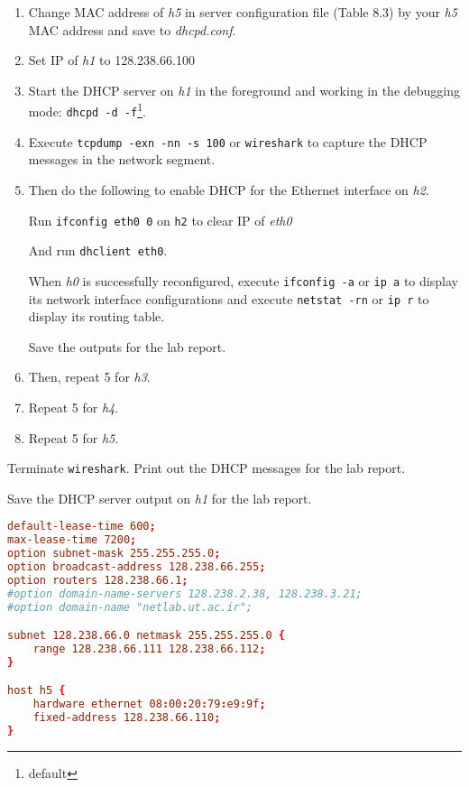 \documentclass{../UTNetLab}
\begin{document}
    \begin{enumerate}
        \item Change MAC address of \textit{h5} in server configuration file (Table 8.3) by your \textit{h5} MAC address and save to \textit{dhcpd.conf}.
        
        \item Set IP of \textit{h1} to {128.238.66.100}
        
        \item Start the DHCP server on \textit{h1} in the foreground and working in the debugging mode: \lstinline{dhcpd -d -f}\footnote{default }.
        
        \item Execute \lstinline{tcpdump -exn -nn -s 100} or \lstinline{wireshark} to capture the DHCP messages in the network segment.
        
        \item Then do the following to enable DHCP for the Ethernet interface on \textit{h2}. 

        Run \lstinline{ifconfig eth0 0} on \lstinline{h2} to clear IP of \textit{eth0}

        And run \lstinline{dhclient eth0}.

        When \textit{h0} is successfully reconfigured, execute \lstinline{ifconfig -a} or \lstinline{ip a} to display its
        network interface configurations and execute \lstinline{netstat -rn} or \lstinline{ip r} to display its routing table.

        Save the outputs for the lab report.
        
        \item Then, repeat 5 for \textit{h3}.
        
        \item Repeat 5 for \textit{h4}.
        
        \item Repeat 5 for \textit{h5}.
    \end{enumerate}
    Terminate \lstinline{wireshark}. Print out the DHCP messages for the lab report. 

    Save the DHCP server output on \textit{h1} for the lab report.

    \begin{lstlisting}[language={conf}, caption={\textit{Table 8.3} A DHCP server configuration file}]
default-lease-time 600;
max-lease-time 7200;
option subnet-mask 255.255.255.0;
option broadcast-address 128.238.66.255;
option routers 128.238.66.1;
#option domain-name-servers 128.238.2.38, 128.238.3.21;
#option domain-name "netlab.ut.ac.ir";

subnet 128.238.66.0 netmask 255.255.255.0 {
    range 128.238.66.111 128.238.66.112;
}

host h5 {
    hardware ethernet 08:00:20:79:e9:9f;
    fixed-address 128.238.66.110;
}
    \end{lstlisting}
\end{document}
